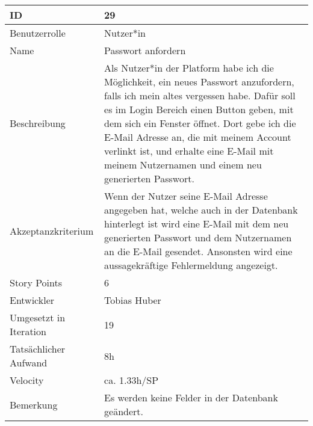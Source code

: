 \begin{tabularx}{\textwidth}{|p{}|X|}
	\hline
	ID & 29 \\
	\hline
	Benutzerrolle & Nutzer*in \\
	\hline
	Name & Passwort anfordern\\
	\hline
	Beschreibung & Als Nutzer*in der Platform habe ich die Möglichkeit, ein neues Passwort anzufordern, falls ich mein altes vergessen habe. Dafür soll es im Login Bereich einen Button geben, mit dem sich ein Fenster öffnet. Dort gebe ich die E-Mail Adresse an, die mit meinem Account verlinkt ist, und erhalte eine E-Mail mit meinem Nutzernamen und einem neu generierten Passwort. \\
	\hline
	Akzeptanzkriterium & Wenn der Nutzer seine E-Mail Adresse angegeben hat, welche auch in der Datenbank hinterlegt ist wird eine E-Mail mit dem neu generierten Passwort und dem Nutzernamen an die E-Mail gesendet. Ansonsten wird eine aussagekräftige Fehlermeldung angezeigt. \\
	\hline
	Story Points & 6\\
	\hline
	Entwickler & Tobias Huber\\
	\hline
	Umgesetzt in Iteration & 19\\
	\hline
	Tatsächlicher Aufwand & 8h\\
	\hline
	Velocity & ca. 1.33h/SP\\
	\hline
	Bemerkung & Es werden keine Felder in der Datenbank geändert.\\
	\hline
\end{tabularx}
\vspace{20pt}
